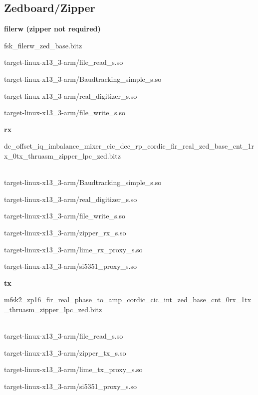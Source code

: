 \subsection{Zedboard/Zipper}
	\noindent\textbf{filerw (zipper not required)}
	\begin{itemize}
	\begin{minipage}[t]{.5\textwidth}
	\item fsk\_filerw\_zed\_base.bitz
	\item target-linux-x13\_3-arm/file\_read\_s.so
	\item target-linux-x13\_3-arm/Baudtracking\_simple\_s.so
	\end{minipage}
	\begin{minipage}[t]{.5\textwidth}
	\item target-linux-x13\_3-arm/real\_digitizer\_s.so
	\item target-linux-x13\_3-arm/file\_write\_s.so
	\end{minipage}
	\end{itemize}

	\noindent\textbf{rx}
	\begin{itemize}
	\item dc\_offset\_iq\_imbalance\_mixer\_cic\_dec\_rp\_cordic\_fir\_real\_zed\_base\_cnt\_1rx\_0tx\_thruasm\_zipper\_lpc\_zed.bitz \\ \\
	\begin{minipage}[t]{.5\textwidth}
	\item target-linux-x13\_3-arm/Baudtracking\_simple\_s.so
	\item target-linux-x13\_3-arm/real\_digitizer\_s.so
	\item target-linux-x13\_3-arm/file\_write\_s.so
	\end{minipage}
	\begin{minipage}[t]{.5\textwidth}
	\item target-linux-x13\_3-arm/zipper\_rx\_s.so
	\item target-linux-x13\_3-arm/lime\_rx\_proxy\_s.so
	\item target-linux-x13\_3-arm/si5351\_proxy\_s.so
	\end{minipage}
	\end{itemize}

	\noindent\textbf{tx}
	\begin{itemize}
	\item mfsk2\_zp16\_fir\_real\_phase\_to\_amp\_cordic\_cic\_int\_zed\_base\_cnt\_0rx\_1tx\_thruasm\_zipper\_lpc\_zed.bitz
\\ \\
	\begin{minipage}[t]{.5\textwidth}
	\item target-linux-x13\_3-arm/file\_read\_s.so
	\item target-linux-x13\_3-arm/zipper\_tx\_s.so
	\end{minipage}
	\begin{minipage}[t]{.5\textwidth}
	\item target-linux-x13\_3-arm/lime\_tx\_proxy\_s.so
	\item target-linux-x13\_3-arm/si5351\_proxy\_s.so
	\end{minipage}
	\end{itemize}

